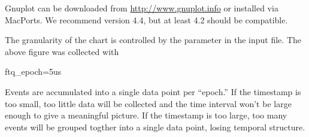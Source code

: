 Gnuplot can be downloaded from \url{http://www.gnuplot.info} or installed via MacPorts.
We recommend version 4.4, but at least 4.2 should be compatible.

The granularity of the chart is controlled by the  parameter in the input file. 
The above figure was collected with

\begin{ViFile}
ftq_epoch=5us
\end{ViFile}
Events are accumulated into a single data point per ``epoch.''
If the timestamp is too small, too little data will be collected and the time interval won't be large enough to give a meaningful picture.
If the timestamp is too large, too many events will be grouped togther into a single data point, losing temporal structure.

